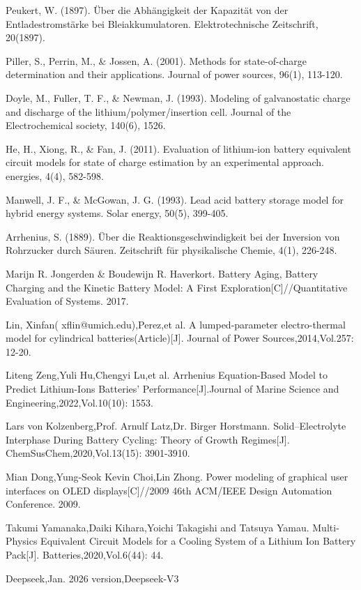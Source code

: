 \documentclass[11pt,a4paper]{ctexart}
\begin{document}
\begin{enumerate}[label={[\arabic*]},leftmargin=2.2em,itemsep=0.25em]
\small
\item Peukert, W. (1897). Über die Abhängigkeit der Kapazität von der Entladestromstärke bei Bleiakkumulatoren. Elektrotechnische Zeitschrift, 20(1897).

\item Piller, S., Perrin, M., \& Jossen, A. (2001). Methods for state-of-charge determination and their applications. Journal of power sources, 96(1), 113-120.

\item Doyle, M., Fuller, T. F., \& Newman, J. (1993). Modeling of galvanostatic charge and discharge of the lithium/polymer/insertion cell. Journal of the Electrochemical society, 140(6), 1526.

\item He, H., Xiong, R., \& Fan, J. (2011). Evaluation of lithium-ion battery equivalent circuit models for state of charge estimation by an experimental approach. energies, 4(4), 582-598.

\item Manwell, J. F., \& McGowan, J. G. (1993). Lead acid battery storage model for hybrid energy systems. Solar energy, 50(5), 399-405.

\item Arrhenius, S. (1889). Über die Reaktionsgeschwindigkeit bei der Inversion von Rohrzucker durch Säuren. Zeitschrift für physikalische Chemie, 4(1), 226-248.

\item Marijn R. Jongerden \& Boudewijn R. Haverkort. Battery Aging, Battery Charging and the Kinetic Battery Model: A First Exploration[C]//Quantitative Evaluation of Systems. 2017.

\item Lin, Xinfan( xflin@umich.edu),Perez,et al. A lumped-parameter electro-thermal model for cylindrical batteries(Article)[J]. Journal of Power Sources,2014,Vol.257: 12-20.

\item Liteng Zeng,Yuli Hu,Chengyi Lu,et al. Arrhenius Equation-Based Model to Predict Lithium-Ions Batteries' Performance[J].Journal of Marine Science and Engineering,2022,Vol.10(10): 1553.

\item Lars von Kolzenberg,Prof. Arnulf Latz,Dr. Birger Horstmann. Solid--Electrolyte Interphase During Battery Cycling: Theory of Growth Regimes[J]. ChemSusChem,2020,Vol.13(15): 3901-3910.

\item Mian Dong,Yung-Seok Kevin Choi,Lin Zhong. Power modeling of graphical user interfaces on OLED displays[C]//2009 46th ACM/IEEE Design Automation Conference. 2009.

\item Takumi Yamanaka,Daiki Kihara,Yoichi Takagishi and Tatsuya Yamau. Multi-Physics Equivalent Circuit Models for a Cooling System of a Lithium Ion Battery Pack[J]. Batteries,2020,Vol.6(44): 44.

\item Deepseek,Jan. 2026 version,Deepseek-V3
\end{enumerate}
\normalsize
\end{document}

